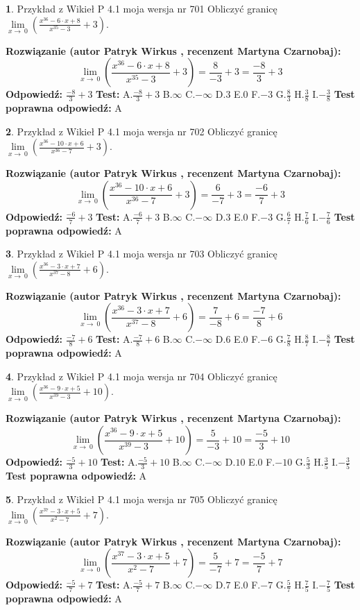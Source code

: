 \documentclass[12pt, a4paper]{article}
\theoremstyle{definition} %
\newtheorem{zad}{}
\newcommand{\zadStart}[1]{\begin{zad}#1\newline}
\newcommand{\zadStop}{\end{zad}}
\newcommand{\rozwStart}[2]{\noindent \textbf{Rozwiązanie (autor #1 , recenzent #2): }\newline}
\newcommand{\rozwStop}{\newline}
\newcommand{\odpStart}{\noindent \textbf{Odpowiedź:}\newline}
\newcommand{\odpStop}{\newline}
\newcommand{\testStart}{\noindent \textbf{Test:}\newline}
\newcommand{\testStop}{\newline}
\newcommand{\kluczStart}{\noindent \textbf{Test poprawna odpowiedź:}\newline}
\newcommand{\kluczStop}{\newline}
\begin{document}
\zadStart{Przykład z Wikieł P 4.1 moja wersja nr 701}
Obliczyć granicę $\lim\limits_{x\to\ 0}(\frac{x^{36}-6 \cdot x +8}{x^{35}-3}+3)$.
\zadStop
\rozwStart{Patryk Wirkus}{Martyna Czarnobaj}
$$\lim\limits_{x\to\ 0}(\frac{x^{36}-6 \cdot x +8}{x^{35}-3}+3)=\frac{8}{-3}+3=\frac{-8}{3}+3$$
\rozwStop
\odpStart
$\frac{-8}{3}+3$
\odpStop
\testStart
A.$\frac{-8}{3}+3$
B.$\infty$
C.$-\infty$
D.$3$
E.$0$
F.$-3$
G.$\frac{8}{3}$
H.$\frac{3}{8}$
I.$-\frac{3}{8}$
\testStop
\kluczStart
A
\kluczStop



\zadStart{Przykład z Wikieł P 4.1 moja wersja nr 702}
Obliczyć granicę $\lim\limits_{x\to\ 0}(\frac{x^{36}-10 \cdot x +6}{x^{36}-7}+3)$.
\zadStop
\rozwStart{Patryk Wirkus}{Martyna Czarnobaj}
$$\lim\limits_{x\to\ 0}(\frac{x^{36}-10 \cdot x +6}{x^{36}-7}+3)=\frac{6}{-7}+3=\frac{-6}{7}+3$$
\rozwStop
\odpStart
$\frac{-6}{7}+3$
\odpStop
\testStart
A.$\frac{-6}{7}+3$
B.$\infty$
C.$-\infty$
D.$3$
E.$0$
F.$-3$
G.$\frac{6}{7}$
H.$\frac{7}{6}$
I.$-\frac{7}{6}$
\testStop
\kluczStart
A
\kluczStop



\zadStart{Przykład z Wikieł P 4.1 moja wersja nr 703}
Obliczyć granicę $\lim\limits_{x\to\ 0}(\frac{x^{36}-3 \cdot x +7}{x^{37}-8}+6)$.
\zadStop
\rozwStart{Patryk Wirkus}{Martyna Czarnobaj}
$$\lim\limits_{x\to\ 0}(\frac{x^{36}-3 \cdot x +7}{x^{37}-8}+6)=\frac{7}{-8}+6=\frac{-7}{8}+6$$
\rozwStop
\odpStart
$\frac{-7}{8}+6$
\odpStop
\testStart
A.$\frac{-7}{8}+6$
B.$\infty$
C.$-\infty$
D.$6$
E.$0$
F.$-6$
G.$\frac{7}{8}$
H.$\frac{8}{7}$
I.$-\frac{8}{7}$
\testStop
\kluczStart
A
\kluczStop



\zadStart{Przykład z Wikieł P 4.1 moja wersja nr 704}
Obliczyć granicę $\lim\limits_{x\to\ 0}(\frac{x^{36}-9 \cdot x +5}{x^{39}-3}+10)$.
\zadStop
\rozwStart{Patryk Wirkus}{Martyna Czarnobaj}
$$\lim\limits_{x\to\ 0}(\frac{x^{36}-9 \cdot x +5}{x^{39}-3}+10)=\frac{5}{-3}+10=\frac{-5}{3}+10$$
\rozwStop
\odpStart
$\frac{-5}{3}+10$
\odpStop
\testStart
A.$\frac{-5}{3}+10$
B.$\infty$
C.$-\infty$
D.$10$
E.$0$
F.$-10$
G.$\frac{5}{3}$
H.$\frac{3}{5}$
I.$-\frac{3}{5}$
\testStop
\kluczStart
A
\kluczStop



\zadStart{Przykład z Wikieł P 4.1 moja wersja nr 705}
Obliczyć granicę $\lim\limits_{x\to\ 0}(\frac{x^{37}-3 \cdot x +5}{x^{2}-7}+7)$.
\zadStop
\rozwStart{Patryk Wirkus}{Martyna Czarnobaj}
$$\lim\limits_{x\to\ 0}(\frac{x^{37}-3 \cdot x +5}{x^{2}-7}+7)=\frac{5}{-7}+7=\frac{-5}{7}+7$$
\rozwStop
\odpStart
$\frac{-5}{7}+7$
\odpStop
\testStart
A.$\frac{-5}{7}+7$
B.$\infty$
C.$-\infty$
D.$7$
E.$0$
F.$-7$
G.$\frac{5}{7}$
H.$\frac{7}{5}$
I.$-\frac{7}{5}$
\testStop
\kluczStart
A
\kluczStop
\end{document}
